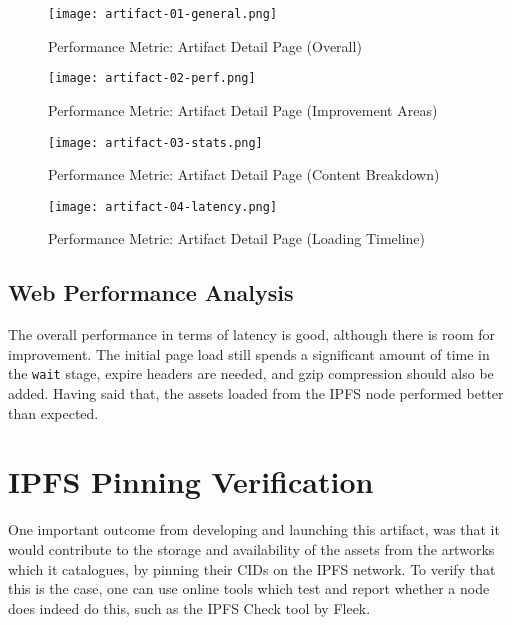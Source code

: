 \begin{figure}[H]
    \centering
    \texttt{[image: artifact-01-general.png]}
    \caption[Performance Metric: Artifact Detail Page (Overall)]{Performance Metric: Artifact Detail Page (Overall)}
    \label{fig:artifact-01-general}
\end{figure}

\begin{figure}[H]
    \centering
    \texttt{[image: artifact-02-perf.png]}
    \caption[Performance Metric: Artifact Detail Page (Improvement Areas)]{Performance Metric: Artifact Detail Page (Improvement Areas)}
    \label{fig:artifact-02-perf.png}
\end{figure}

\begin{figure}[H]
    \centering
    \texttt{[image: artifact-03-stats.png]}
    \caption[Performance Metric: Artifact Detail Page (Content Breakdown)]{Performance Metric: Artifact Detail Page (Content Breakdown)}
    \label{fig:artifact-03-stats.png}
\end{figure}

\begin{figure}[H]
    \centering
    \texttt{[image: artifact-04-latency.png]}
    \caption[Performance Metric: Artifact Detail Page (Loading Timeline)]{Performance Metric: Artifact Detail Page (Loading Timeline)}
    \label{fig:artifact-04-latency.png}
\end{figure}


\subsection{Web Performance Analysis}

The overall performance in terms of latency is good, although there is room for improvement. The initial page load still spends a significant amount of time in the \texttt{wait} stage, expire headers are needed, and gzip compression should also be added. Having said that, the assets loaded from the IPFS node performed better than expected.


\section{IPFS Pinning Verification}

One important outcome from developing and launching this artifact, was that it would contribute to the storage and availability of the assets from the artworks which it catalogues, by pinning their CIDs on the IPFS network. To verify that this is the case, one can use online tools which test and report whether a node does indeed do this, such as the IPFS Check tool by Fleek\footnotemark[2].

